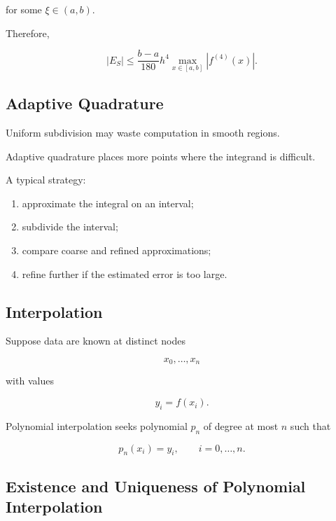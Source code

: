 for some \(\xi\in(a,b)\).

Therefore,

\[
\boxed{
|E_S|
\leq
\frac{
b-a
}{
180
}
h^4
\max_{x\in[a,b]}
|f^{(4)}(x)|.
}
\]

\subsection{Adaptive Quadrature}
\label{subsec:adaptive-quadrature}

Uniform subdivision may waste computation in smooth regions.

Adaptive quadrature places more points where the integrand is difficult.

A typical strategy:

\begin{enumerate}
    \item approximate the integral on an interval;
    \item subdivide the interval;
    \item compare coarse and refined approximations;
    \item refine further if the estimated error is too large.
\end{enumerate}

\subsection{Interpolation}
\label{subsec:numerical-interpolation}

Suppose data are known at distinct nodes

\[
x_0,\ldots,x_n
\]

with values

\[
y_i=f(x_i).
\]

Polynomial interpolation seeks polynomial \(p_n\) of degree at most \(n\)
such that

\[
\boxed{
p_n(x_i)
=
y_i,
\qquad
i=0,\ldots,n.
}
\]

\subsection{Existence and Uniqueness of Polynomial Interpolation}
\label{subsec:interpolation-existence-uniqueness}

